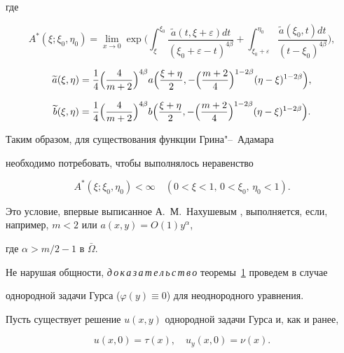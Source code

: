 где

$$

A^*(\xi;\xi_0,\eta_0)=\lim\limits_{x\rightarrow 0} \exp\biggl(

 \int _{\xi}^{\xi_0} \frac{\widetilde{a}(t,\xi+\varepsilon)dt}{(\xi_0+\varepsilon-t)^{4\beta}}+

 \int _{\xi_0+\varepsilon}^{\eta_0} \frac{\widetilde{a}(\xi_0,t)dt}{(t-\xi_0)^{4\beta}}

\biggr),

$$

$$

\widetilde{a}(\xi,\eta)=\frac{1}{4} \Bigl(\frac{4}{m+2}\Bigr)^{4\beta} a

\Bigl(\frac{\xi+\eta}{2},-\Bigl(\frac{m+2}{4}\Bigr)^{1-2\beta}

(\eta-\xi)^{1-2\beta} \Bigr),

$$

$$

\widetilde{b}(\xi,\eta)=\frac{1}{4} \Bigl(\frac{4}{m+2}\Bigr)^{4\beta} b

\Bigl(\frac{\xi+\eta}{2},-\Bigl(\frac{m+2}{4}\Bigr)^{1-2\beta}

(\eta-\xi)^{1-2\beta} \Bigr).

$$



Таким образом, для существования функции Грина"--~Адамара 

необходимо потребовать, чтобы выполнялось неравенство

$$

A^*(\xi;\xi_0,\eta_0)<\infty \quad (0<\xi<1,\, 0<\xi_0,\, \eta_0<1).

$$

Это условие, впервые выписанное А.~М.~Нахушевым  \cite{Attfor2015_lit_03}, выполняется, если, например, $m<2$ или $a(x, y)=O(1)y^\alpha$, 

где $\alpha>{m}/{2}-1$ в $\bar{\Omega}$. 



\smallskip



Не нарушая общности, {\it д\,о\,к\,а\,з\,а\,т\,е\,л\,ь\,с\,т\,в\,о}\/ теоремы~\hyperlink{att:th1}{1}  проведем в случае

однородной задачи Гурса ($\varphi(y)\equiv 0$) для  неоднородного уравнения.



Пусть существует решение $u(x,y)$ однородной задачи Гурса и, как и ранее,

$$u(x , 0)=\tau(x),\quad u_y(x , 0)=\nu(x).$$ 

